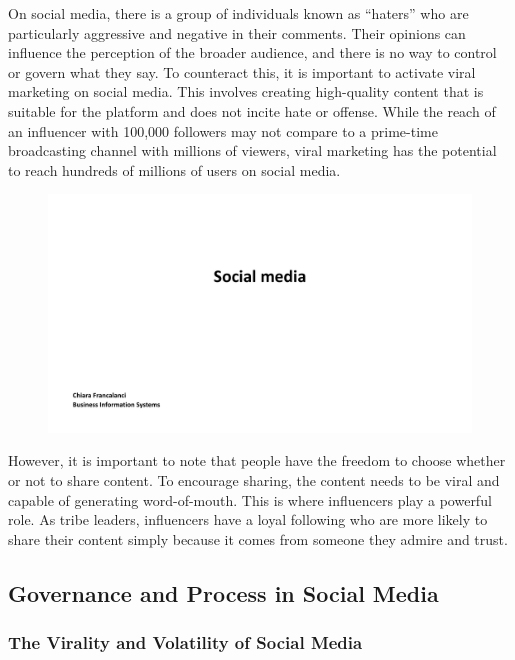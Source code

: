 On social media, there is a group of individuals known as ``haters'' who
are particularly aggressive and negative in their comments. Their
opinions can influence the perception of the broader audience, and there
is no way to control or govern what they say. To counteract this, it is
important to activate viral marketing on social media. This involves
creating high-quality content that is suitable for the platform and does
not incite hate or offense. While the reach of an influencer with
100,000 followers may not compare to a prime-time broadcasting channel
with millions of viewers, viral marketing has the potential to reach
hundreds of millions of users on social media.

\begin{figure}[!h]
  \centering
  \includegraphics[page=20, trim = 1cm 0cm 2cm 1cm, clip, width=\imagewidth]{images/04 - Social_Media.pdf}
\end{figure}

However, it is important to note that people have the freedom to choose
whether or not to share content. To encourage sharing, the content needs
to be viral and capable of generating word-of-mouth. This is where
influencers play a powerful role. As tribe leaders, influencers have a
loyal following who are more likely to share their content simply
because it comes from someone they admire and trust.

\subsection{Governance and Process in Social
  Media}\label{governance-and-process-in-social-media}

\subsubsection{The Virality and Volatility of Social
  Media}\label{the-virality-and-volatility-of-social-media}

